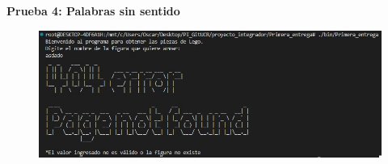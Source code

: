 \documentclass[a4paper,10pt]{article}
\begin{document}
	 \noindent \textbf{Prueba 4: Palabras sin sentido}\\
		\begin{figure}[ht]
 	  	\centering
 	  	\includegraphics[scale=.7]{non_sense.jpeg}
	 	\end{figure}
    \vfill
    \clearpage
	
	
\end{document}
